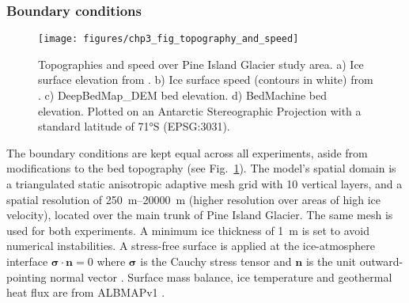 





\subsubsection{Boundary conditions} \label{sec:boundary_conditions}

\begin{figure}[htbp]
  \centering
  \texttt{[image: figures/chp3\_fig\_topography\_and\_speed]}
  \caption[Topographies and Speed over Pine Island Glacier]{
    Topographies and speed over Pine Island Glacier study area.
    a) Ice surface elevation from \citet{HowatReferenceElevationModel2019}.
    b) Ice surface speed (contours in white) from \citet{MouginotMEaSUREsPhaseMap2019}.
    c) DeepBedMap\_DEM bed elevation.
    d) BedMachine bed elevation.
    Plotted on an Antarctic Stereographic Projection with a standard latitude of 71°S (EPSG:3031).
  }
  \label{fig:topo_and_speed}
\end{figure}

The boundary conditions are kept equal across all experiments, aside from modifications to the bed topography (see Fig.~\ref{fig:topo_and_speed}). %
The model's spatial domain is a triangulated static anisotropic adaptive mesh grid with 10 vertical layers, and a spatial resolution of \SIrange{250}{20000}{\metre} (higher resolution over areas of high ice velocity), located over the main trunk of Pine Island Glacier.
The same mesh is used for both experiments.
A minimum ice thickness of \SI{1}{\metre} is set to avoid numerical instabilities.
A stress-free surface is applied at the ice-atmosphere interface $\boldsymbol{\sigma} \cdot \boldsymbol{n} = 0$ where $\boldsymbol{\sigma}$ is the Cauchy stress tensor and $\boldsymbol{n}$ is the unit outward-pointing normal vector \citep[][eq. 18]{LarourContinentalscalehigh2012}.
Surface mass balance, ice temperature and geothermal heat flux are from ALBMAPv1 \citep{LeBrocqimprovedAntarcticdataset2010}.

